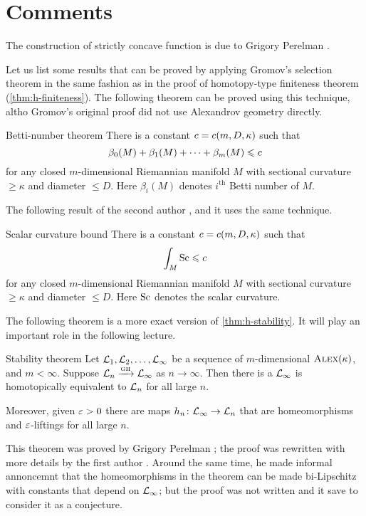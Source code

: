 \section{Comments}

The construction of strictly concave function is due to Grigory Perelman \cite{perelman1993,perelman-petrunin}.

Let us list some results that can be proved by applying Gromov's selection theorem
in the same fashion as in the proof of homotopy-type finiteness theorem (\ref{thm:h-finiteness}).
The following theorem can be proved using this technique, altho Gromov's original proof \cite{gromov-1981} did not use Alexandrov geometry directly.

\begin{thm}{Betti-number theorem}
There is a constant $c=c(m,D,\kappa)$ such that 
\[\beta_0(M)+\beta_1(M)+\dots+\beta_m(M)\leqslant c\]
for any closed $m$-dimensional Riemannian manifold $M$ with sectional curvature $\ge \kappa$ and diameter $\le D$.
Here $\beta_i(M)$ denotes $i^\text{th}$ Betti number of $M$.
\end{thm}

The following result of the second author \cite{petrunin2008}, and it uses the same technique.

\begin{thm}{Scalar curvature bound}
There is a constant $c=c(m,D,\kappa)$ such that 
\[\int_M\mathrm{Sc}\leqslant c\]
for any closed $m$-dimensional Riemannian manifold $M$ with sectional curvature $\ge \kappa$ and diameter $\le D$.
Here $\mathrm{Sc}$ denotes the scalar curvature.
\end{thm}

The following theorem is a more exact version of \ref{thm:h-stability}.
It will play an important role in the following lecture.

\begin{thm}{Stability theorem}\label{thm:stability}
Let $\mathcal{L}_1,\mathcal{L}_2,\dots,\mathcal{L}_\infty$ be a sequence of $m$-dimensional $\textsc{Alex}(\kappa)$, and $m<\infty$.
Suppose $\mathcal{L}_n\xrightarrow{\mbox{\tiny\rm GH}} \mathcal{L}_\infty$ as $n\to \infty$.
Then there is a $\mathcal{L}_\infty$ is homotopically equivalent to $\mathcal{L}_n$ for all large $n$.

Moreover, given $\varepsilon>0$ there are maps $h_n\colon\mathcal{L}_\infty\to \mathcal{L}_n$ that are homeomorphisms and $\varepsilon$-liftings for all large $n$.
\end{thm}

This theorem was proved by Grigory Perelman \cite{perelman1991};
the proof was rewritten with more details by the first author \cite{kapovitch}.
Around the same time, he made informal annoncemnt that the homeomorphisms in the theorem can be made bi-Lipschitz with constants that depend on $\mathcal{L}_\infty$;
but the proof was not written and it save to consider it as a conjecture.

